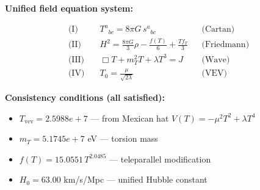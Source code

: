 
\textbf{Unified field equation system:}

\begin{align}
  \text{(I)} \quad & T^a{}_{bc} = 8\pi G \, s^a{}_{bc} && \text{(Cartan)} \\
  \text{(II)} \quad & H^2 = \frac{8\pi G}{3}\rho - \frac{f(T)}{6} + \frac{Tf_T}{3} && \text{(Friedmann)} \\
  \text{(III)} \quad & \Box T + m_T^2 T + \lambda T^3 = J && \text{(Wave)} \\
  \text{(IV)} \quad & T_0 = \frac{\mu}{\sqrt{2\lambda}} && \text{(VEV)}
\end{align}

\textbf{Consistency conditions (all satisfied):}
\begin{itemize}
  \item $T_{\text{vev}} = 2.5988e+7$ — from Mexican hat $V(T) = -\mu^2 T^2 + \lambda T^4$
  \item $m_T = 5.1745e+7$ eV — torsion mass
  \item $f(T) = 15.0551 \, T^{2.0485}$ — teleparallel modification
  \item $H_0 = 63.00$ km/s/Mpc — unified Hubble constant
\end{itemize}